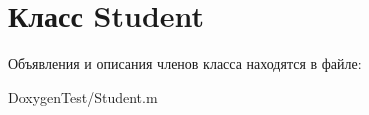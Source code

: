 \section{Класс Student}
\label{class_student}


Объявления и описания членов класса находятся в файле\+:\begin{DoxyCompactItemize}
\item 
Doxygen\+Test/Student.\+m\end{DoxyCompactItemize}
